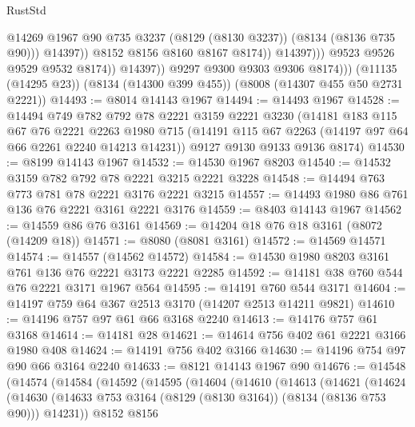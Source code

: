\begin{lexlean}{RustStd}
\begin{coremodule}
{\begin{coremodule}
{{{{{{{{{{{{{{{{{{{{{{{{{{{{{{{{{{{{{{{{{{{{{{{{{{{{{                                  @14269
                                  @1967
                                  @90
                                  @735
                                  @3237
                                  (@8129 (@8130 @3237))
                                  (@8134 (@8136 @735 @90)))
                                @14397))
                            @8152
                            @8156
                            @8160
                            @8167
                            @8174))
                        @14397)))
                  @9523
                  @9526
                  @9529
                  @9532
                  @8174))
              @14397))
          @9297
          @9300
          @9303
          @9306
          @8174)))
    (@11135 (@14295 @23))
    (@8134 (@14300 @399 @455))
    (@8008 (@14307 @455 @50 @2731 @2221))
@14493 := @8014 @14143 @1967
@14494 := @14493 @1967
@14528 := @14494
    @749
    @782
    @792
    @78
    @2221
    @3159
    @2221
    @3230
    (@14181
      @183
      @115
      @67
      @76
      @2221
      @2263
      @1980
      @715
      (@14191 @115 @67 @2263 (@14197 @97 @64 @66 @2261 @2240 @14213 @14231))
      @9127
      @9130
      @9133
      @9136
      @8174)
@14530 := @8199 @14143 @1967
@14532 := @14530 @1967 @8203
@14540 := @14532 @3159 @782 @792 @78 @2221 @3215 @2221 @3228
@14548 := @14494 @763 @773 @781 @78 @2221 @3176 @2221 @3215
@14557 := @14493 @1980 @86 @761 @136 @76 @2221 @3161 @2221 @3176
@14559 := @8403 @14143 @1967
@14562 := @14559 @86 @76 @3161
@14569 := @14204 @18 @76 @18 @3161 (@8072 (@14209 @18))
@14571 := @8080 (@8081 @3161)
@14572 := @14569 @14571
@14574 := @14557 (@14562 @14572)
@14584 := @14530 @1980 @8203 @3161 @761 @136 @76 @2221 @3173 @2221 @2285
@14592 := @14181 @38 @760 @544 @76 @2221 @3171 @1967 @564
@14595 := @14191 @760 @544 @3171
@14604 := @14197 @759 @64 @367 @2513 @3170 (@14207 @2513 @14211 @9821)
@14610 := @14196 @757 @97 @61 @66 @3168 @2240
@14613 := @14176 @757 @61 @3168
@14614 := @14181 @28
@14621 := @14614 @756 @402 @61 @2221 @3166 @1980 @408
@14624 := @14191 @756 @402 @3166
@14630 := @14196 @754 @97 @90 @66 @3164 @2240
@14633 := @8121 @14143 @1967 @90
@14676 := @14548
    (@14574
      (@14584
        (@14592
          (@14595
            (@14604
              (@14610
                (@14613
                  (@14621
                    (@14624
                      (@14630
                        (@14633 @753 @3164 (@8129 (@8130 @3164)) (@8134 (@8136 @753 @90)))
                        @14231))
                    @8152
                    @8156
}}}}}}}}}}}}}}}}}}}}}}}}}}}}}}}}}}}}}}}}}}}}}}}}}}}}}
\end{coremodule}}
\end{coremodule}
\end{lexlean}
